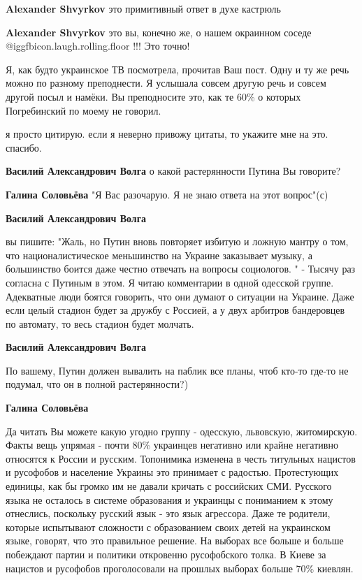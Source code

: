 \begin{itemize}
\begin{itemize} %
\textbf{Alexander Shvyrkov} это примитивный ответ в духе кастрюль

\textbf{Alexander Shvyrkov} это вы, конечно же, о нашем окраинном соседе @igg{fbicon.laugh.rolling.floor} !!! Это точно!
\end{itemize} %


Я, как будто украинское ТВ посмотрела, прочитав Ваш пост. Одну и ту же речь
можно по разному преподнести. Я услышала совсем другую речь и совсем другой
посыл и намёки. Вы преподносите это, как те 60\% о которых Погребинский по моему
не говорил.

\begin{itemize} %
я просто цитирую. если я неверно привожу цитаты, то укажите мне на это. спасибо.

\textbf{Василий Александрович Волга} о какой растерянности Путина Вы говорите?

\textbf{Галина Соловьёва} "Я Вас разочарую. Я не знаю ответа на этот вопрос"(с)

\textbf{Василий Александрович Волга} 

вы пишите: "Жаль, но Путин вновь повторяет избитую и ложную мантру о том, что
националистическое меньшинство на Украине заказывает музыку, а большинство
боится даже честно отвечать на вопросы социологов. " - Тысячу раз согласна с
Путиным в этом. Я читаю комментарии в одной одесской группе. Адекватные люди
боятся говорить, что они думают о ситуации на Украине. Даже если целый стадион
будет за дружбу с Россией, а у двух арбитров бандеровцев по автомату, то весь
стадион будет молчать.

\textbf{Василий Александрович Волга} 

По вашему, Путин должен вывалить на паблик все планы, чтоб кто-то где-то не
подумал, что он в полной растерянности?)

\textbf{Галина Соловьёва} 

Да читать Вы можете какую угодно группу - одесскую, львовскую, житомирскую.
Факты вещь упрямая - почти 80\% украинцев негативно или крайне негативно
относятся к России и русским. Топонимика изменена в честь титульных нацистов и
русофобов и население Украины это принимает с радостью. Протестующих единицы,
как бы громко им не давали кричать с российских СМИ. Русского языка не осталось
в системе образования и украинцы с пониманием к этому отнеслись, поскольку
русский язык - это язык агрессора. Даже те родители, которые испытывают
сложности с образованием своих детей на украинском языке, говорят, что это
правильное решение. На выборах все больше и больше побеждают партии и политики
откровенно русофобского толка. В Киеве за нацистов и русофобов проголосовали на
прошлых выборах больше 70\% киевлян.


\end{itemize}
\end{itemize}
